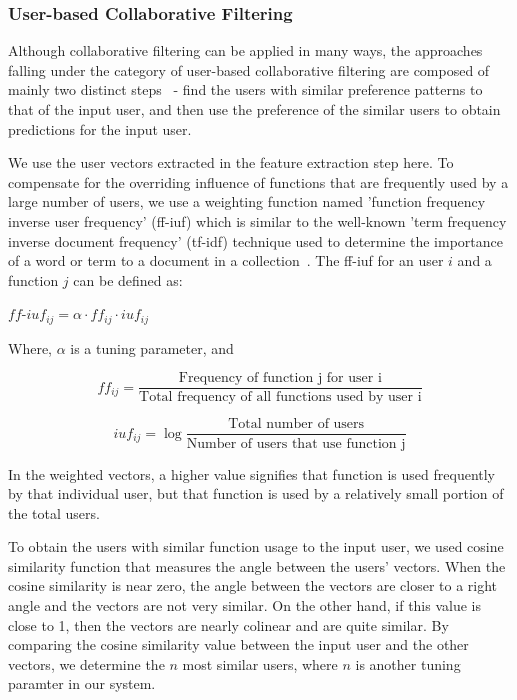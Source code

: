\documentclass{article} %
\begin{document}
\subsubsection{User-based Collaborative Filtering}
Although collaborative filtering can be applied in many ways, the approaches falling under the category of user-based collaborative filtering are composed of mainly two distinct steps~\cite{breese1998empirical} - find the users with similar preference patterns to that of the input user, and then use the preference of the similar users to obtain predictions for the input user.

We use the user vectors extracted in the feature extraction step here. To compensate for the overriding influence of functions that are frequently used by a large number of users, we use a weighting function named 'function frequency inverse user frequency' (ff-iuf) which is similar to the well-known 'term frequency inverse document frequency' (tf-idf) technique used to determine the importance of a word or term to a document in a collection~\cite{sparck1972statistical}. The ff-iuf for an user $i$ and a function $j$ can be defined as:
\begin{center}
   $ff\mbox{-}iuf_{ij} = \alpha \cdot ff_{ij} \cdot iuf_{ij}$
\end{center}

Where, $\alpha$ is a tuning parameter, and
\begin{center}
   \begin{displaymath}
   ff_{ij} = \frac{\mbox{Frequency of function j for user i}}{\mbox{Total frequency of all functions used by user i}}
   \end{displaymath}
\end{center}

\begin{center}
   \begin{displaymath}
   iuf_{ij} = \log \frac{\mbox{Total number of users}}{\mbox{Number of users that use function j}}
   \end{displaymath}
\end{center}

In the weighted vectors, a higher value signifies that function is used frequently by that individual user, but that function is used by a relatively small portion of the total users.

To obtain the users with similar function usage to the input user, we used cosine similarity function that measures the angle between the users' vectors. When the cosine similarity is near zero, the angle between the vectors are closer to a right angle and the vectors are not very similar. On the other hand, if this value is close to 1, then the vectors are nearly colinear and are quite similar. By comparing the cosine similarity value between the input user and the other vectors, we determine the $n$ most similar users, where $n$ is another tuning paramter in our system.
\end{document}
